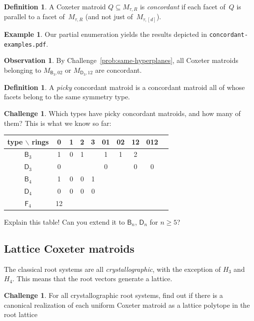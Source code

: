\documentclass[11pt]{amsart}
\newcommand\BB{{\mathsf B}}
\newcommand\DD{{\mathsf D}}
\newcommand\FF{{\mathsf F}}
\theoremstyle{definition}
\newtheorem{definition}[theorem]{Definition}
\newtheorem{observation}[theorem]{Observation}
\newtheorem{example}[theorem]{Example}
\newtheorem{challenge}[theorem]{Challenge}
\begin{document}
\begin{definition}
  A Coxeter matroid $Q\subseteq M_{\tau,R}$ is \emph{concordant} if each facet of~$Q$ is parallel to a facet of~$M_{\tau,R}$ (and not just of~$M_{\tau,[d]}$).
\end{definition}

\begin{example}
  Our partial enumeration yields the results depicted in \texttt{concordant-examples.pdf}.
\end{example}

\begin{observation}
  By Challenge~\ref{prob:same-hyperplanes}, all Coxeter matroids belonging to $M_{\BB_3,02}$ or $M_{\DD_3,12}$ are concordant. 
\end{observation}

\begin{definition}
  A \emph{picky} concordant matroid is a concordant matroid all of whose facets belong to the same symmetry type.
\end{definition}

\begin{challenge}
  Which types have picky concordant matroids, and how many of them? This is what we know so far:
  \begin{center}
    \begin{tabular}[c]{c|ccccccccc}
      type $\backslash$ rings& 0 & 1 & 2 & 3 & 01 & 02 & 12 & 012\\\hline
      $\BB_3$     & 1 & 0 & 1 &   & 1  & 1  & 2  \\
      $\DD_3$     & 0 &   &   &   & 0  &    & 0  & 0 \\
      $\BB_4$     & 1 & 0 & 0 & 1\\
      $\DD_4$     & 0 & 0 & 0 & 0\\
      $\FF_4$     & 12
    \end{tabular}
  \end{center}
  Explain this table! Can you extend it to $\BB_n$, $\DD_n$ for $n\ge5$?
\end{challenge}

\subsection{Lattice Coxeter matroids}

The classical root systems are all \emph{crystallographic}, with the exception of $H_3$ and $H_4$.
This means that the root vectors generate a lattice.

\begin{challenge}\label{chall:root-lattice}
  For all crystallographic root systems, find out if there is a canonical realization of each uniform Coxeter matroid as a lattice polytope in the root lattice
\end{challenge}
\end{document}
